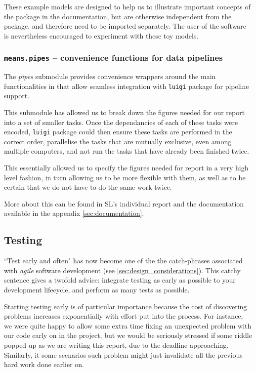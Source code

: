 These example models are designed to help us to illustrate important concepts of the package in the documentation, but are otherwise independent from the package, and therefore need to be imported separately.
The user of the software is nevertheless encouraged to experiment with these toy models.

\subsubsection{{\tt means.pipes} -- convenience functions for data pipelines}
The \emph{pipes} submodule provides convenience wrappers around the main functionalities in \means{} that allow seamless integration with \verb"luigi" package for pipeline support\cite{_luigi_????}.

This submodule has allowed us to break down the figures needed for our report into a set of smaller tasks. 
Once the dependancies of each of these tasks were encoded, \verb"luigi" package could then ensure these tasks are performed in the correct order, parallelise the tasks that are mutually exclusive, even among multiple computers, and not run the tasks that have already been finished twice.

This essentially allowed us to specify the figures needed for report in a very high level fashion, in turn allowing us to be more flexible with them, as well as to be certain that we do not have to do the same work twice.

More about this can be found in SL's individual report and the documentation available in the appendix \autoref{sec:documentation}.


\subsection{Testing}
\label{sec:testing}

``Test early and often" has now become one of the the catch-phrases associated with \emph{agile} software development (see \autoref{sec:design_considerations}). 
This catchy sentence gives a twofold advice: integrate testing as early as possible to your development lifecycle, and perform as many tests as possible.

Starting testing early is of particular importance because the cost of discovering problems increases exponentially with effort put into the process.  
For instance, we were quite happy to allow some extra time fixing an unexpected problem with our code early on in the project, but we would be seriously stressed if some riddle popped up as we are writing this report, due to the deadline approaching. 
Similarly, it some scenarios such problem might just invalidate all the previous hard work done earlier on.

